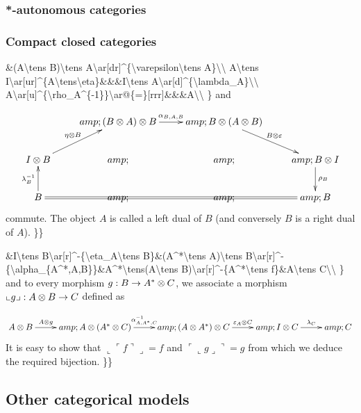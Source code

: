 \subsubsection{*-autonomous categories}\label{autonomous-categories}

\subsubsection{Compact closed categories}\label{compact-closed-categories}

\&(A\textbackslash{}tens B)\textbackslash{}tens
A\textbackslash{}ar{[}dr{]}\^{}\{\textbackslash{}varepsilon\textbackslash{}tens
A\}\textbackslash{}\textbackslash{} A\textbackslash{}tens
I\textbackslash{}ar{[}ur{]}\^{}\{A\textbackslash{}tens\textbackslash{}eta\}\&\&\&I\textbackslash{}tens
A\textbackslash{}ar{[}d{]}\^{}\{\textbackslash{}lambda\_A\}\textbackslash{}\textbackslash{}
A\textbackslash{}ar{[}u{]}\^{}\{\textbackslash{}rho\_A\^{}\{-1\}\}\textbackslash{}ar@\{=\}{[}rrr{]}\&\&\&A\textbackslash{}\textbackslash{}
\} and

\[\xymatrix{
&amp;(B\tens A)\tens B\ar[r]^{\alpha_{B,A,B}}&amp;B\tens(A\tens B)\ar[dr]^{B\tens\varepsilon}\\
I\tens B\ar[ur]^{\eta\tens B}&amp;&amp;&amp;B\tens I\ar[d]^{\rho_B}\\
B\ar[u]^{\lambda_B^{-1}}\ar@{=}[rrr]&amp;&amp;&amp;B\\
}\] commute. The object \(A\) is called a left dual of \(B\) (and
conversely \(B\) is a right dual of \(A\)). \}\}

\&I\textbackslash{}tens
B\textbackslash{}ar{[}r{]}\^{}-\{\textbackslash{}eta\_A\textbackslash{}tens
B\}\&(A\^{}*\textbackslash{}tens A)\textbackslash{}tens
B\textbackslash{}ar{[}r{]}\^{}-\{\textbackslash{}alpha\_\{A\^{}*,A,B\}\}\&A\^{}*\textbackslash{}tens(A\textbackslash{}tens
B)\textbackslash{}ar{[}r{]}\^{}-\{A\^{}*\textbackslash{}tens
f\}\&A\textbackslash{}tens C\textbackslash{}\textbackslash{} \} and to
every morphism \(g:B\to A^*\otimes C\), we associate a morphism
\(\llcorner g\lrcorner:A\otimes B\to C\) defined as

\[\xymatrix{
A\tens B\ar[r]^-{A\tens g}&amp;A\tens(A^*\tens C)\ar[r]^-{\alpha_{A,A^*,C}^{-1}}&amp;(A\tens A^*)\tens C\ar[r]^-{\varepsilon_A\tens C}&amp;I\tens C\ar[r]^-{\lambda_C}&amp;C
}\] It is easy to show that
\(\llcorner \ulcorner f\urcorner\lrcorner=f\) and
\(\ulcorner\llcorner g\lrcorner\urcorner=g\) from which we deduce the
required bijection. \}\}

\subsection{Other categorical models}\label{other-categorical-models}

